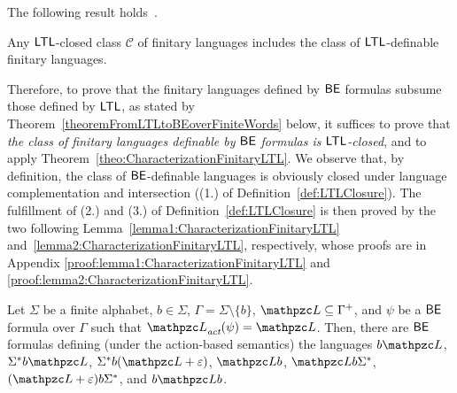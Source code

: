 The following result holds~\cite{stacs/Wilke99}.
  \begin{theorem}\label{theo:CharacterizationFinitaryLTL} Any $\text{\sffamily LTL}$-closed class  $\mathcal{C}$ of finitary languages includes the class of  $\text{\sffamily LTL}$-definable finitary languages.
  \end{theorem}

Therefore, to prove that the finitary languages defined by  $\mathsf{BE}$ formulas subsume those defined by $\text{\sffamily LTL}$, as stated by Theorem~\ref{theoremFromLTLtoBEoverFiniteWords} below, it suffices to prove that \emph{the class of finitary languages definable by $\mathsf{BE}$ formulas is $\text{\sffamily LTL}$-closed}, and to apply Theorem~\ref{theo:CharacterizationFinitaryLTL}.
We observe that, by definition, the class of $\mathsf{BE}$-definable languages is obviously closed under language complementation and intersection ((1.) of Definition~\ref{def:LTLClosure}). The fulfillment of (2.) and (3.) of Definition~\ref{def:LTLClosure} is then proved by the two following Lemma~\ref{lemma1:CharacterizationFinitaryLTL} and~\ref{lemma2:CharacterizationFinitaryLTL}, respectively, whose proofs are in Appendix \ref{proof:lemma1:CharacterizationFinitaryLTL} and \ref{proof:lemma2:CharacterizationFinitaryLTL}.


 \begin{lemma}\label{lemma1:CharacterizationFinitaryLTL} Let $\Sigma$ be a finite alphabet,
  $b\in \Sigma$, $\Gamma=\Sigma\setminus\{b\}$, $\Lang\subseteq \Gamma^{+}$, and $\psi$ be a $\mathsf{BE}$ formula over $\Gamma$ such that $\Lang_\act(\psi)=\Lang$. Then,
  there are $\mathsf{BE}$ formulas defining (under the action-based semantics) the languages
   $b\Lang$, $\Sigma^* b\Lang$, $\Sigma^* b(\Lang+\varepsilon)$,
   $\Lang b$, $ \Lang b \Sigma^* $, $ (\Lang+\varepsilon) b \Sigma^* $, and $b \Lang b$.
  \end{lemma}



